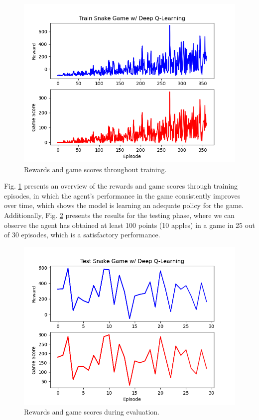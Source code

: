 \documentclass[conference]{IEEEtran}
\begin{document}
\begin{figure}[h]
    \centering
    \includegraphics[width=\columnwidth]{dqn_training2.png}
    \caption{Rewards and game scores throughout training.}
    \label{TrainingResults}
\end{figure}

Fig. \ref{TrainingResults} presents an overview of the rewards and game scores through training episodes, in which the agent's performance in the game consistently improves over time, which shows the model is learning an adequate policy for the game. Additionally, Fig. \ref{TestingResults} presents the results for the testing phase, where we can observe the agent has obtained at least 100 points (10 apples) in a game in 25 out of 30 episodes, which is a satisfactory performance. 

\begin{figure}[h]
    \centering
    \includegraphics[width=\columnwidth]{dqn_testing.png}
    \caption{Rewards and game scores during evaluation.}
    \label{TestingResults}
\end{figure}
\end{document}
